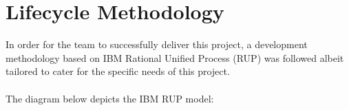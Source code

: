 \documentclass[12pt]{article} %
\begin{document}
	
	
	
	


	
	
	
	
	
	
	
	

	
	
	\section{Lifecycle Methodology}
	
	
	In order for the team to successfully deliver this project, a development methodology based on IBM Rational Unified Process (RUP) was followed albeit tailored to cater for the specific needs of this project.\\
	\\
	The diagram below depicts the IBM RUP model:
	
\end{document}
